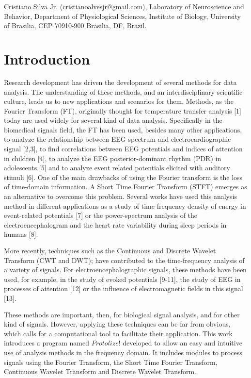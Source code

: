 \documentclass[12pt, a4paper]{article}
\begin{document}
Cristiano Silva Jr. (cristianoalvesjr@gmail.com), Laboratory of Neuroscience and Behavior, Department of Physiological Sciences, Institute of Biology, University of Brasilia, CEP 70910-900 Brasilia, DF,  Brazil.

\section{Introduction}

Research development has driven the development of several methods for data analysis. The understanding of these methods, and an interdisciplinary scientific culture, leads us to new applications and scenarios for them. Methods, as the Fourier Transform (FT), originally thought for temperature transfer analysis [1] today are used widely for several kind of data analysis. Specifically in the biomedical signals field, the FT has been used, besides many other applications, to analyze the relationship between EEG spectrum and electrocardiographic signal [2,3], to find correlations between EEG potentials and indices of attention in children [4], to analyze the EEG posterior-dominant rhythm (PDR) in adolescents [5] and to analyze event related potentials elicited with auditory stimuli [6]. One of the main drawbacks of using the Fourier transform is the loss of time-domain information. A Short Time Fourier Transform (STFT) emerges as an alternative to overcome this problem. Several works have used this analysis method in different applications as a study of time-frequency density of energy in event-related potentials [7] or the power-spectrum analysis of the electroencephalogram and the heart rate variability during sleep periods in humans [8].

More recently, techniques such as the Continuous and Discrete Wavelet Transform (CWT and DWT); have contributed to the time-frequency analysis of a variety of signals. For electroencephalographic signals, these methods have been used, for example, in the study of evoked potentials [9-11], the study of EEG in processes of attention [12] or the influence of electromagnetic fields in this signal [13].

These methods are important, then, for biological signal analysis, and for other kind of signals. However, applying these techniques can be far from obvious, which calls for a computational tool to facilitate their application. This work introduces a program named $Protolize!$ developed to allow an easy and intuitive use of analysis methods in the frequency domain. It includes modules to process signals using the Fourier Transform, the Short Time Fourier Transform, Continuous Wavelet Transform and Discrete Wavelet Transform.
\end{document}
